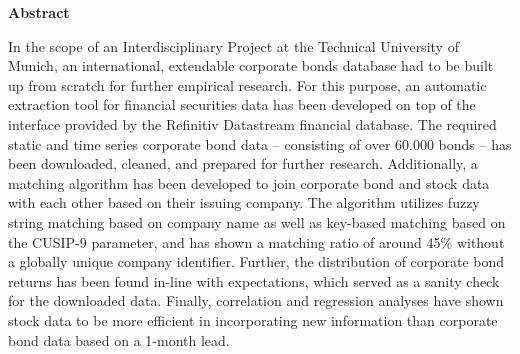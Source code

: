 
{}	

\vspace*{2cm}
\begin{center}
{\Large \bf Abstract}
\end{center}
\vspace{1cm}

In the scope of an Interdisciplinary Project at the Technical University of Munich, an international, extendable corporate bonds database had to be built up from scratch for further empirical research. For this purpose, an automatic extraction tool for financial securities data has been developed on top of the interface provided by the Refinitiv Datastream financial database. The required static and time series corporate bond data -- consisting of over 60.000 bonds -- has been downloaded, cleaned, and prepared for further research. Additionally, a matching algorithm has been developed to join corporate bond and stock data with each other based on their issuing company. The algorithm utilizes fuzzy string matching based on company name as well as key-based matching based on the CUSIP-9 parameter, and has shown a matching ratio of around 45\% without a globally unique company identifier. Further, the distribution of corporate bond returns has been found in-line with expectations, which served as a sanity check for the downloaded data. Finally, correlation and regression analyses have shown stock data to be more efficient in incorporating new information than corporate bond data based on a 1-month lead. 
